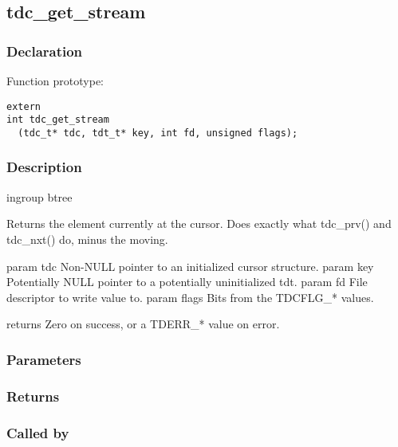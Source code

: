 
\newpage
\subsection{tdc\_get\_stream}
\subsubsection{Declaration} Function prototype:

\begin{verbatim}
extern
int tdc_get_stream
  (tdc_t* tdc, tdt_t* key, int fd, unsigned flags);
\end{verbatim}

\subsubsection{Description}


 ingroup btree

 Returns the element currently at the cursor.
 Does exactly what tdc\_prv() and tdc\_nxt() do, minus the moving.

 param tdc Non-NULL pointer to an initialized cursor structure.
 param key Potentially NULL pointer to a potentially uninitialized tdt.
 param fd File descriptor to write value to.
 param flags Bits from the TDCFLG\_* values.

 returns Zero on success, or a TDERR\_* value on error.
 

\subsubsection{Parameters}
\subsubsection{Returns}
\subsubsection{Called by}
